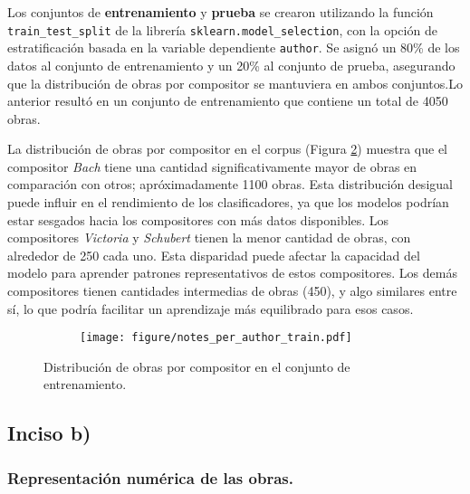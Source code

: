 \documentclass[paper=letter, fontsize=11pt, draft=false]{scrartcl}
\numberwithin{equation}{problemcounter} %
\numberwithin{figure}{problemcounter} %
\numberwithin{table}{problemcounter} %
\numberwithin{subsection}{problemcounter}
\begin{document}
Los conjuntos de \textbf{entrenamiento} y \textbf{prueba} se crearon utilizando la función \texttt{train\_test\_split} de la librería \texttt{sklearn.model\_selection}, con la opción de estratificación basada en la variable dependiente \texttt{author}. Se asignó un 80\% de los datos al conjunto de entrenamiento y un 20\% al conjunto de prueba, asegurando que la distribución de obras por compositor se mantuviera en ambos conjuntos.Lo anterior resultó en un conjunto de entrenamiento que contiene un total de 4050 obras.

La distribución de obras por compositor en el corpus (Figura \ref{fig:notes_per_author}) muestra que el compositor \textit{Bach} tiene una cantidad significativamente mayor de obras en comparación con otros; apróximadamente 1100 obras. Esta distribución desigual puede influir en el rendimiento de los clasificadores, ya que los modelos podrían estar sesgados hacia los compositores con más datos disponibles. Los compositores \textit{Victoria} y \textit{Schubert} tienen la menor cantidad de obras, con alrededor de 250 cada uno. Esta disparidad puede afectar la capacidad del modelo para aprender patrones representativos de estos compositores. Los demás compositores tienen cantidades intermedias de obras (450), y algo similares entre sí, lo que podría facilitar un aprendizaje más equilibrado para esos casos.

\begin{figure}
    \centering
    \begin{subfigure}[b]{\linewidth}
        \centering
        \texttt{[image: figure/notes\_per\_author\_train.pdf]}
        \caption{}
        \label{fig:notes_per_author_train}
    \end{subfigure}
    \caption{Distribución de obras por compositor en el conjunto de entrenamiento.}
    \label{fig:notes_per_author}
\end{figure}



\subsection{Inciso b)}

\subsubsection{Representación numérica de las obras.}
\end{document}
